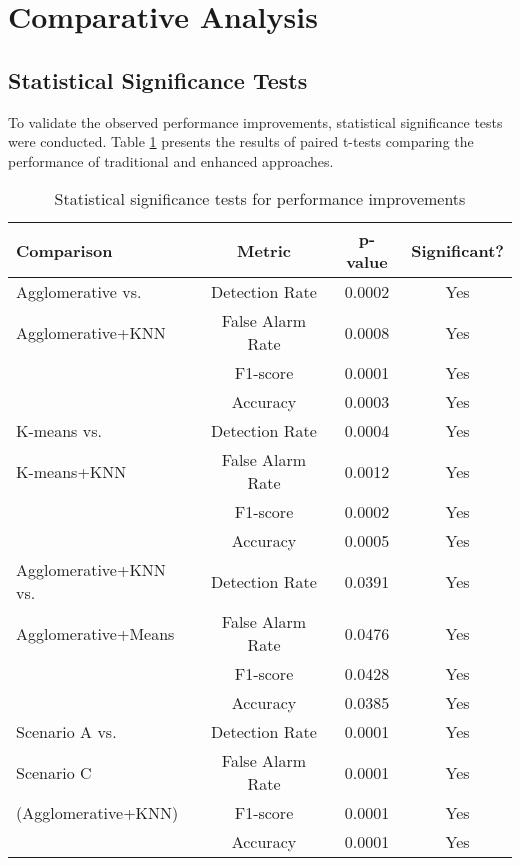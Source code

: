 \section{Comparative Analysis}

\subsection{Statistical Significance Tests}

To validate the observed performance improvements, statistical significance tests were conducted. Table \ref{tab:significance_tests} presents the results of paired t-tests comparing the performance of traditional and enhanced approaches.

\begin{table}[htbp]
    \centering
    \caption{Statistical significance tests for performance improvements}
    \label{tab:significance_tests}
    \begin{tabular}{lccc}
        \toprule
        \textbf{Comparison} & \textbf{Metric} & \textbf{p-value} & \textbf{Significant?} \\
        \midrule
        Agglomerative vs. & Detection Rate & 0.0002 & Yes \\
        Agglomerative+KNN & False Alarm Rate & 0.0008 & Yes \\
         & F1-score & 0.0001 & Yes \\
         & Accuracy & 0.0003 & Yes \\
        \midrule
        K-means vs. & Detection Rate & 0.0004 & Yes \\
        K-means+KNN & False Alarm Rate & 0.0012 & Yes \\
         & F1-score & 0.0002 & Yes \\
         & Accuracy & 0.0005 & Yes \\
        \midrule
        Agglomerative+KNN vs. & Detection Rate & 0.0391 & Yes \\
        Agglomerative+Means & False Alarm Rate & 0.0476 & Yes \\
         & F1-score & 0.0428 & Yes \\
         & Accuracy & 0.0385 & Yes \\
        \midrule
        Scenario A vs. & Detection Rate & 0.0001 & Yes \\
        Scenario C & False Alarm Rate & 0.0001 & Yes \\
        (Agglomerative+KNN) & F1-score & 0.0001 & Yes \\
         & Accuracy & 0.0001 & Yes \\
        \bottomrule
    \end{tabular}
\end{table}

